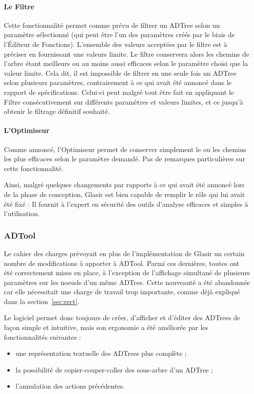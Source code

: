 \paragraph{Le Filtre} Cette fonctionnalité permet comme prévu de filtrer un ADTree selon un paramètre sélectionné (qui peut être l'un des paramètres créés par le biais de l'Éditeur de Fonctions). L'ensemble des valeurs acceptées par le filtre est à préciser en fournissant une valeurs limite. Le filtre conservera alors les chemins de l'arbre étant meilleurs ou au moins aussi efficaces selon le paramètre choisi que la valeur limite. Cela dit, il est impossible de filtrer en une seule fois un ADTree selon plusieurs paramètres, contrairement à ce qui avait été annoncé dans le rapport de spécifications. Celui-ci peut malgré tout être fait en appliquant le Filtre consécutivement sur différents paramètres et valeurs limites, et ce jusqu'à obtenir le filtrage définitif souhaité.

\paragraph{L'Optimiseur} Comme annoncé, l'Optimiseur permet de conserver simplement le ou les chemins les plus efficaces selon le paramètre demandé. Pas de remarques particulières sur cette fonctionnalité.

Ainsi, malgré quelques changements par rapports à ce qui avait été annoncé lors de la phase de conception, Glasir est bien capable de remplir le rôle qui lui avait été fixé :  Il fournit à l'expert en sécurité des outils d'analyse efficaces et simples à l'utilisation.

\subsubsection{ADTool}
\label{sssec:obj_adtool}

Le cahier des charges prévoyait en plus de l'implémentation de Glasir un certain nombre de modifications à apporter à ADTool. Parmi ces dernières, toutes ont été correctement mises en place, à l'exception de l'affichage simultané de plusieurs paramètres sur les noeuds d'un même ADTree. Cette nouveauté a été abandonnée car elle nécessitait une charge de travail trop importante, comme déjà expliqué dans la {\sc section}~\ref{sec:rect}.

Le logiciel permet donc toujours de créer, d'afficher et d'éditer des ADTrees de façon simple et intuitive, mais son ergonomie a été améliorée par les fonctionnalités suivantes :
\begin{itemize}
	\item une représentation textuelle des ADTrees plus complète ;
	\item la possibilité de copier-couper-coller des sous-arbre d'un ADTree ;
	\item l'annulation des actions précédentes.
\end{itemize}

